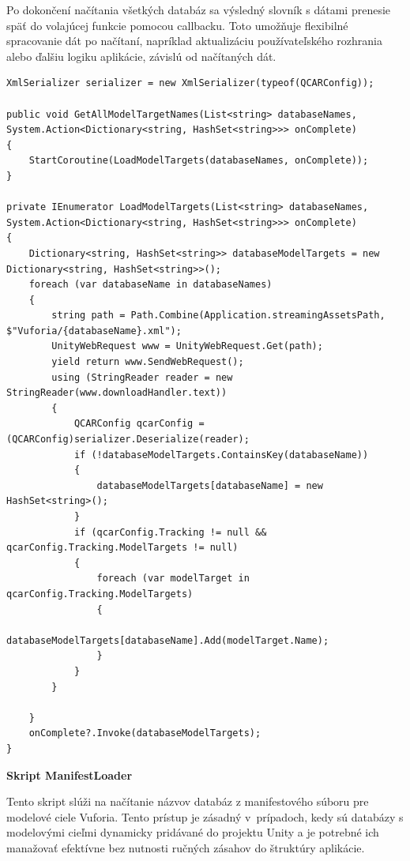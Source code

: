 Po dokončení načítania všetkých databáz sa výsledný slovník s dátami prenesie späť do volajúcej funkcie pomocou callbacku. Toto umožňuje flexibilné spracovanie dát po načítaní, napríklad aktualizáciu používateľského rozhrania alebo ďalšiu logiku aplikácie, závislú od načítaných dát.

\lstset{style=Csharp}
\begin{lstlisting}[caption={ModelTargetDatabaseXmlReader Class - Čítanie databázy z xml súboru}, label=modelTargetDatabaseXmlReader]
XmlSerializer serializer = new XmlSerializer(typeof(QCARConfig));

public void GetAllModelTargetNames(List<string> databaseNames, System.Action<Dictionary<string, HashSet<string>>> onComplete)
{
    StartCoroutine(LoadModelTargets(databaseNames, onComplete));
}

private IEnumerator LoadModelTargets(List<string> databaseNames, System.Action<Dictionary<string, HashSet<string>>> onComplete)
{
    Dictionary<string, HashSet<string>> databaseModelTargets = new Dictionary<string, HashSet<string>>();
    foreach (var databaseName in databaseNames)
    {
        string path = Path.Combine(Application.streamingAssetsPath, $"Vuforia/{databaseName}.xml");
        UnityWebRequest www = UnityWebRequest.Get(path);
        yield return www.SendWebRequest();
        using (StringReader reader = new StringReader(www.downloadHandler.text))
        {
            QCARConfig qcarConfig = (QCARConfig)serializer.Deserialize(reader);
            if (!databaseModelTargets.ContainsKey(databaseName))
            {
                databaseModelTargets[databaseName] = new HashSet<string>();
            }
            if (qcarConfig.Tracking != null && qcarConfig.Tracking.ModelTargets != null)
            {
                foreach (var modelTarget in qcarConfig.Tracking.ModelTargets)
                {
                    databaseModelTargets[databaseName].Add(modelTarget.Name);
                }
            }
        }
        
    }
    onComplete?.Invoke(databaseModelTargets);
}
\end{lstlisting} 

{\large\textbf{Skript ManifestLoader}}

Tento skript slúži na načítanie názvov databáz z manifestového súboru pre modelové ciele Vuforia. Tento prístup je zásadný v~prípadoch, kedy sú databázy s modelovými cieľmi dynamicky pridávané do projektu Unity a je potrebné ich manažovať efektívne bez nutnosti ručných zásahov do štruktúry aplikácie.

